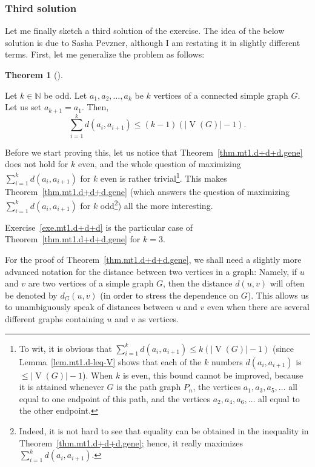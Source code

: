 \documentclass[numbers=enddot,12pt,final,onecolumn,notitlepage]{scrartcl}%
\newcounter{exer}
\theoremstyle{definition}
\newtheorem{theo}{Theorem}[section]
\newenvironment{theorem}[1][]
{\begin{theo}[#1]\begin{leftbar}}
{\end{leftbar}\end{theo}}
\let\sumnonlimits\sum
\renewcommand{\sum}{\sumnonlimits\limits}
\newcommand{\NN}{\mathbb{N}}
\newcommand{\abs}[1]{\left| #1 \right|}
\newcommand{\tup}[1]{\left( #1 \right)}
\newcommand{\verts}[1]{\operatorname{V}\left( #1 \right)}
\begin{document}
\subsubsection{Third solution}

Let me finally sketch a third solution of the exercise. The idea of
the below solution is due to Sasha Pevzner, although I am restating it
in slightly different terms. First, let me generalize the problem as
follows:

\Needspace{4cm}
\begin{theorem} \label{thm.mt1.d+d+d.gene}
Let $k \in \NN$ be odd. Let $a_1, a_2, \ldots, a_k$ be $k$ vertices of
a connected simple graph $G$. Let us set $a_{k+1} = a_1$.
Then,
\[
\sum_{i=1}^k d \tup{a_i, a_{i+1}}
\leq \tup{k-1} \tup{\abs{\verts{G}}-1} .
\]
\end{theorem}

Before we start proving this, let us notice that
Theorem~\ref{thm.mt1.d+d+d.gene} does not hold for $k$ even, and the
whole question of maximizing $\sum_{i=1}^k d \tup{a_i, a_{i+1}}$ for
$k$ even is rather trivial\footnote{To wit, it is obvious that
  $\sum_{i=1}^k d \tup{a_i, a_{i+1}} \leq k \tup{\abs{\verts{G}}-1}$
  (since Lemma~\ref{lem.mt1.d-leq-V} shows that each
  of the $k$ numbers $d \tup{a_i, a_{i+1}}$ is
  $\leq \abs{\verts{G}}-1$).
  When $k$ is even, this bound cannot be improved,
  because it is attained whenever $G$ is the path graph $P_n$, the
  vertices $a_1, a_3, a_5, \ldots$ all equal to one endpoint of this
  path, and the vertices $a_2, a_4, a_6, \ldots$ all equal to the
  other endpoint.}.
This makes Theorem~\ref{thm.mt1.d+d+d.gene} (which answers the
question of maximizing $\sum_{i=1}^k d \tup{a_i, a_{i+1}}$ for
$k$ odd\footnote{Indeed, it is not hard to see that equality
  can be obtained in the inequality in
  Theorem~\ref{thm.mt1.d+d+d.gene}; hence, it really maximizes
  $\sum_{i=1}^k d \tup{a_i, a_{i+1}}$.})
all the more interesting.

Exercise~\ref{exe.mt1.d+d+d} is the particular case of
Theorem~\ref{thm.mt1.d+d+d.gene} for $k = 3$.

For the proof of Theorem~\ref{thm.mt1.d+d+d.gene}, we shall need a
slightly more advanced notation for the distance between two vertices
in a graph: Namely, if $u$ and $v$ are two vertices of a simple graph
$G$, then the distance $d \tup{u, v}$ will often be denoted by
$d_G \tup{u, v}$ (in order to stress the dependence on $G$). This
allows us to unambiguously speak of distances between $u$ and $v$ even
when there are several different graphs containing $u$ and $v$
as vertices.
\end{document}
